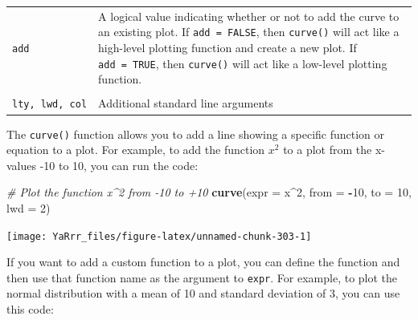 \documentclass[]{book}
\newenvironment{Shaded}{\begin{snugshade}}{\end{snugshade}}
\newcommand{\KeywordTok}[1]{\textcolor[rgb]{0.13,0.29,0.53}{\textbf{#1}}}
\newcommand{\DataTypeTok}[1]{\textcolor[rgb]{0.13,0.29,0.53}{#1}}
\newcommand{\DecValTok}[1]{\textcolor[rgb]{0.00,0.00,0.81}{#1}}
\newcommand{\CommentTok}[1]{\textcolor[rgb]{0.56,0.35,0.01}{\textit{#1}}}
\newcommand{\OperatorTok}[1]{\textcolor[rgb]{0.81,0.36,0.00}{\textbf{#1}}}
\newcommand{\NormalTok}[1]{#1}
\theoremstyle{definition}
\theoremstyle{definition}
\theoremstyle{remark}
\begin{document}
\begin{longtable}[]{@{}ll@{}}
\begin{minipage}[t]{0.14\columnwidth}
\texttt{add}\strut
\end{minipage} & \begin{minipage}[t]{0.71\columnwidth}\raggedright\strut
A logical value indicating whether or not to add the curve to an
existing plot. If \texttt{add\ =\ FALSE}, then \texttt{curve()} will act
like a high-level plotting function and create a new plot. If
\texttt{add\ =\ TRUE}, then \texttt{curve()} will act like a low-level
plotting function.\strut
\end{minipage}\tabularnewline
\begin{minipage}[t]{0.14\columnwidth}\raggedright\strut
\strut
\end{minipage}\tabularnewline
\begin{minipage}[t]{0.14\columnwidth}\raggedright\strut
\texttt{lty,\ lwd,\ col}\strut
\end{minipage} & \begin{minipage}[t]{0.71\columnwidth}\raggedright\strut
Additional standard line arguments\strut
\end{minipage}\tabularnewline
\bottomrule
\end{longtable}

The \texttt{curve()} function allows you to add a line showing a
specific function or equation to a plot. For example, to add the
function \(x^2\) to a plot from the x-values -10 to 10, you can run the
code:

\begin{Shaded}
\begin{Highlighting}[]
\CommentTok{# Plot the function x^2 from -10 to +10}
\KeywordTok{curve}\NormalTok{(}\DataTypeTok{expr =}\NormalTok{ x}\OperatorTok{^}\DecValTok{2}\NormalTok{, }
      \DataTypeTok{from =} \OperatorTok{-}\DecValTok{10}\NormalTok{, }
      \DataTypeTok{to =} \DecValTok{10}\NormalTok{, }\DataTypeTok{lwd =} \DecValTok{2}\NormalTok{)}
\end{Highlighting}
\end{Shaded}

\begin{center}\texttt{[image: YaRrr\_files/figure-latex/unnamed-chunk-303-1]} \end{center}

If you want to add a custom function to a plot, you can define the
function and then use that function name as the argument to
\texttt{expr}. For example, to plot the normal distribution with a mean
of 10 and standard deviation of 3, you can use this code:
\end{document}
